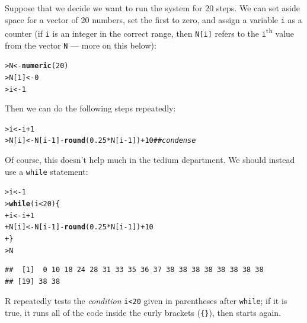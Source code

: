 \documentclass[11pt]{article}\usepackage[]{graphicx}\usepackage[]{color}
\makeatletter
\newcommand{\hlnum}[1]{\textcolor[rgb]{0.686,0.059,0.569}{#1}}%
\newcommand{\hlcom}[1]{\textcolor[rgb]{0.678,0.584,0.686}{\textit{#1}}}%
\newcommand{\hlopt}[1]{\textcolor[rgb]{0,0,0}{#1}}%
\newcommand{\hlstd}[1]{\textcolor[rgb]{0.345,0.345,0.345}{#1}}%
\newcommand{\hlkwa}[1]{\textcolor[rgb]{0.161,0.373,0.58}{\textbf{#1}}}%
\newcommand{\hlkwb}[1]{\textcolor[rgb]{0.69,0.353,0.396}{#1}}%
\newcommand{\hlkwd}[1]{\textcolor[rgb]{0.737,0.353,0.396}{\textbf{#1}}}%
\newenvironment{kframe}{%
 \def\at@end@of@kframe{}%
 \ifinner\ifhmode%
  \def\at@end@of@kframe{\end{minipage}}%
  \begin{minipage}{\columnwidth}%
 \fi\fi%
 \def\FrameCommand##1{\hskip\@totalleftmargin \hskip-\fboxsep
 \colorbox{shadecolor}{##1}\hskip-\fboxsep
     \hskip-\linewidth \hskip-\@totalleftmargin \hskip\columnwidth}%
 \MakeFramed {\advance\hsize-\width
   \@totalleftmargin\z@ \linewidth\hsize
   \@setminipage}}%
 {\par\unskip\endMakeFramed%
 \at@end@of@kframe}
\newenvironment{knitrout}{}{} %
\newcommand{\code}[1]{{\tt #1}}
\numberwithin{exercise}{section}
\makeatother
\begin{document}
Suppose that we decide we want to run the system for 20 steps.
We can set aside space for a vector of 20 numbers, set the
first to zero, and assign a variable \code{i} as a counter
(if \code{i} is an integer in the correct range,
then \code{N[i]} refers to the \code{i}\textsuperscript{th}
value from the vector \code{N} --- more on this below):
\begin{knitrout}
\color{fgcolor}\begin{kframe}
\begin{alltt}
\hlstd{> }\hlstd{N} \hlkwb{<-} \hlkwd{numeric}\hlstd{(}\hlnum{20}\hlstd{)}
\hlstd{> }\hlstd{N[}\hlnum{1}\hlstd{]} \hlkwb{<-} \hlnum{0}
\hlstd{> }\hlstd{i} \hlkwb{<-} \hlnum{1}
\end{alltt}
\end{kframe}
\end{knitrout}
\noindent Then we can do the following steps repeatedly:
\begin{knitrout}
\color{fgcolor}\begin{kframe}
\begin{alltt}
\hlstd{> }\hlstd{i} \hlkwb{<-} \hlstd{i}\hlopt{+}\hlnum{1}
\hlstd{> }\hlstd{N[i]} \hlkwb{<-} \hlstd{N[i}\hlopt{-}\hlnum{1}\hlstd{]}\hlopt{-}\hlkwd{round}\hlstd{(}\hlnum{0.25}\hlopt{*}\hlstd{N[i}\hlopt{-}\hlnum{1}\hlstd{])}\hlopt{+}\hlnum{10}  \hlcom{## condense}
\end{alltt}
\end{kframe}
\end{knitrout}
\noindent Of course, this doesn't help much in the tedium department.
We should instead use a \code{while} statement:
\begin{knitrout}
\color{fgcolor}\begin{kframe}
\begin{alltt}
\hlstd{> }\hlstd{i} \hlkwb{<-} \hlnum{1}
\hlstd{> }\hlkwa{while} \hlstd{(i}\hlopt{<}\hlnum{20}\hlstd{) \{}
\hlstd{+  }  \hlstd{i} \hlkwb{<-} \hlstd{i}\hlopt{+}\hlnum{1}
\hlstd{+  }  \hlstd{N[i]} \hlkwb{<-} \hlstd{N[i}\hlopt{-}\hlnum{1}\hlstd{]}\hlopt{-}\hlkwd{round}\hlstd{(}\hlnum{0.25}\hlopt{*}\hlstd{N[i}\hlopt{-}\hlnum{1}\hlstd{])}\hlopt{+}\hlnum{10}
\hlstd{+  }\hlstd{\}}
\hlstd{> }\hlstd{N}
\end{alltt}
\begin{verbatim}
##  [1]  0 10 18 24 28 31 33 35 36 37 38 38 38 38 38 38 38 38
## [19] 38 38
\end{verbatim}
\end{kframe}
\end{knitrout}
\noindent R repeatedly tests the \emph{condition} \verb+i<20+ given
in parentheses after \code{while}; if it is true, it runs
all of the code inside the
curly brackets (\verb+{}+), then starts again.
\end{document}
